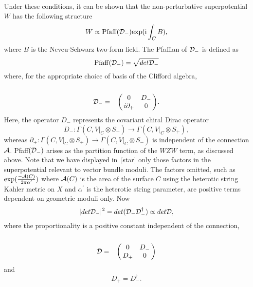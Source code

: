\documentclass[a4paper,12pt]{article}
\numberwithin{equation}{section}
\theoremstyle{plain}
\begin{document}
Under these conditions, it can be shown \cite{Witten2} that the
non-perturbative
superpotential $W$ has the following structure
%
\begin{equation}
W  \propto {\rm Pfaff}({\cal D}_{-}) {\rm exp}({{\rm i} \int_{C} B}),
\label{star}
\end{equation}
%
where $B$ is the Neveu-Schwarz two-form field. The Pfaffian of
${\cal D}_{-}$ is defined as
%
\begin{equation}
{\rm Pfaff}({\cal D}_{-}) = \sqrt{det{\cal D}_{-}}
\label{6}
\end{equation}
%
where, for the appropriate choice of basis of the Clifford algebra,
%
\begin{equation}
{\cal D}_{-} = \bordermatrix{     & {\ } & {\ }  \cr
                             {\ } & 0 & D_{-} \cr
                             {\ } & i\partial_{+} & 0 \cr}.
\label{7}
\end{equation}
%
Here, the operator $D_{-}$ represents the covariant chiral Dirac operator
%
\begin{equation}
D_{-} : \Gamma (C, V|_{C} \otimes S_{-})
\rightarrow  \Gamma (C, V|_{C} \otimes S_{+}),
\label{cross}
\end{equation}
%
whereas $\partial_{+}: \Gamma (C, V|_{C} \otimes S_{+}) \rightarrow
\Gamma (C, V|_{C} \otimes S_{-})$ is independent of the connection
${\cal{A}}$. Pfaff$({\cal D}_{-})$ arises as the partition function of the
$WZW$ term, as discussed above.
Note that we have displayed in~\eqref{star} only those factors in the
superpotential relevant to vector bundle moduli. The factors omitted, such
as ${\rm exp} (\frac{- {\cal A} (C)}{2\pi \alpha^{\prime}})$
where ${\cal A}(C)$ is the area of the surface $C$ using the heterotic
string
Kahler metric on $X$ and $\alpha^{\prime}$ is the heterotic string
parameter,
are positive terms dependent on geometric moduli only.
Now
%
\begin{equation}
|det {\cal D}_{-}|^2 = det({\cal D}_{-} {\cal D}_{-}^{\dagger})
\propto det {\cal D},
\label{8}
\end{equation}
%
where the proportionality is a positive constant independent of the
connection,
%
\begin{equation}
{\cal D} = \bordermatrix{     & {\ } & {\ }  \cr
                             {\ } & 0 & D_{-} \cr
                             {\ } & D_{+} & 0 \cr}
\label{9}
\end{equation}
%
and
%
\begin{equation}
D_+ = D_{-}^{\dagger}.
\label{10}
\end{equation}
\end{document}
